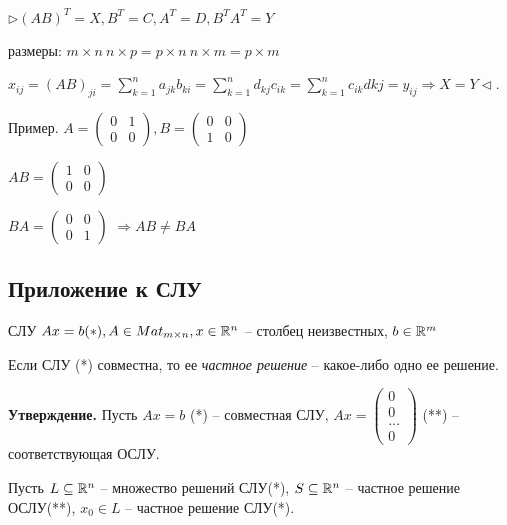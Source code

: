 $ \rhd (AB)^T = X, B^T = C, A^T = D, B^T A^T = Y$

размеры: $m \times n \ n \times p = p \times n \ n \times m = p \times m$

$x_{ij} = (AB)_{ji} = \sum\limits_{k=1}^n a_{jk} b_{ki} = \sum\limits_{k=1}^n d_{kj} c_{ik} = \sum\limits_{k=1}^n c_{ik} d{kj} = y_{ij} \Rightarrow X = Y \lhd$.

\begin{comment}
	Умножение матриц не обладает свойством коммутативности.
\end{comment}

Пример.
$A = \begin{pmatrix} 0 & 1 \\ 0 & 0 \end{pmatrix}, B = \begin{pmatrix} 0 & 0 \\ 1 & 0 \end{pmatrix}$

$AB = \begin{pmatrix} 1 & 0 \\ 0 & 0 \end{pmatrix}$

$BA = \begin{pmatrix} 0 & 0 \\ 0 & 1 \end{pmatrix}$
$\Rightarrow AB \neq BA$

\vspace{\baselineskip}
\subsection{Приложение к СЛУ}

СЛУ $Ax = b (*), A \in Mat_{m \times n}, x \in \mathbb{R}^n$ -- столбец неизвестных, $b \in \mathbb{R}^m$

\vspace{\baselineskip}
Если СЛУ (*) совместна, то ее \textit{частное решение} -- какое-либо одно ее решение.

\vspace{\baselineskip}
\textbf{Утверждение.} Пусть $Ax = b$ (*) -- совместная СЛУ, $Ax = \begin{pmatrix} 0 \\ 0 \\ \dots \\ 0 \end{pmatrix}$ (**) -- соответствующая ОСЛУ.

Пусть $L \subseteq  \mathbb{R}^n$ -- множество решений СЛУ(*), $S \subseteq \mathbb{R}^n$ -- частное решение ОСЛУ(**), $x_0 \in L$ -- частное решение СЛУ(*).

